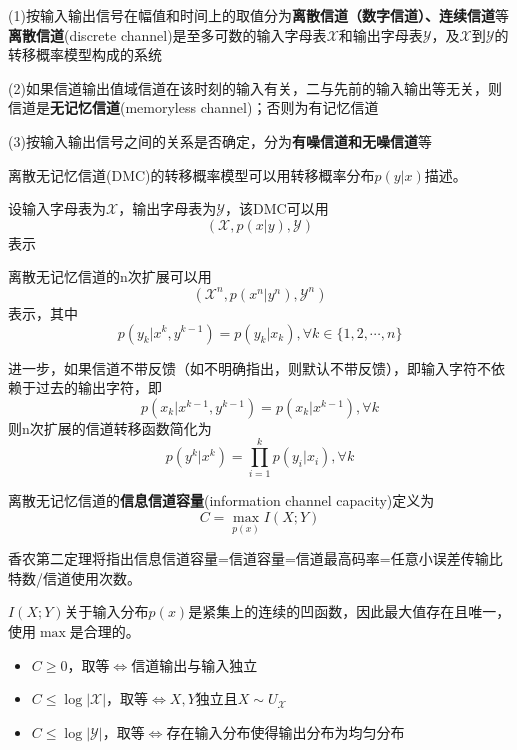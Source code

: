 \documentclass{ctexbook}
\begin{document}
\begin{definition}[信道模型]
    (1)按输入输出信号在幅值和时间上的取值分为\textbf{离散信道（数字信道）、连续信道}等\\
    \textbf{离散信道}(discrete channel)是至多可数的输入字母表$\mathcal{X}$和输出字母表$\mathcal{Y}$，及$\mathcal{X} $到$\mathcal{Y} $的转移概率模型构成的系统

    (2)如果信道输出值域信道在该时刻的输入有关，二与先前的输入输出等无关，则信道是\textbf{无记忆信道}(memoryless channel)；否则为有记忆信道

    (3)按输入输出信号之间的关系是否确定，分为\textbf{有噪信道和无噪信道}等
\end{definition}

\begin{definition}[离散无记忆信道]
    离散无记忆信道(DMC)的转移概率模型可以用转移概率分布$p(y|x)$描述。
    
    设输入字母表为$\mathcal{X} $，输出字母表为$\mathcal{Y} $，该DMC可以用$$(\mathcal{X} ,p(x|y),\mathcal{Y} )$$表示
    
    离散无记忆信道的n次扩展可以用$$(\mathcal{X} ^n,p(x^n|y^n),\mathcal{Y} ^n)$$表示，其中
    \[p(y_k|x^k,y^{k-1})=p(y_k|x_k),\forall k\in\{1,2,\cdots,n\}\]

    进一步，如果信道不带反馈（如不明确指出，则默认不带反馈），即输入字符不依赖于过去的输出字符，即
    $$p(x_k|x^{k-1},y^{k-1})=p(x_k|x^{k-1}),\forall k$$
    则n次扩展的信道转移函数简化为
    \[p(y^k|x^k)=\prod_{i=1}^k p(y_i|x_i),\forall k\]
\end{definition}

\begin{definition}[信息信道容量]
    离散无记忆信道的\textbf{信息信道容量}(information channel capacity)定义为
    \[C = \max_{p(x)} I(X;Y)\]
\end{definition}
香农第二定理将指出信息信道容量=信道容量=信道最高码率=任意小误差传输比特数/信道使用次数。

$I(X;Y)$关于输入分布$p(x)$是紧集上的连续的凹函数，因此最大值存在且唯一，使用$\max$是合理的。

\begin{proposition}[信息信道容量的性质]
    \quad
    \begin{itemize}
        \item $C\geq 0$，取等$\iff$信道输出与输入独立
        \item $C\leq \log |\mathcal{X}|$，取等$\iff X,Y$独立且$X\sim U_{\mathcal{X} }$
        \item $C\leq \log |\mathcal{Y}|$，取等$\iff$存在输入分布使得输出分布为均匀分布
    \end{itemize}
\end{proposition}
\end{document}
